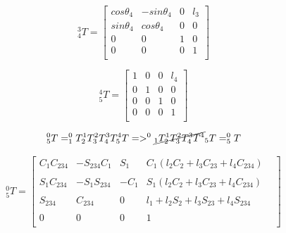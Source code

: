 \documentclass[transmag]{IEEEtran}
\begin{document}
\begin{eqfloat}
\begin{equation}
^3_4T =
\begin{bmatrix}
cos\theta_4 & -sin\theta_4 & 0      & l_3 \\
sin\theta_4 & cos\theta_4  & 0      & 0   \\
0           & 0            & 1      & 0   \\
0           & 0            & 0      & 1   \\
\end{bmatrix}
\end{equation}



\begin{equation}
^4_5T =
\begin{bmatrix}
1 & 0 & 0 & l_4  \\
0 & 1 & 0 & 0   \\
0 & 0 & 1 & 0   \\
0 & 0 & 0 & 1   \\
\end{bmatrix}
\end{equation}

\begin{equation}
^0_5T = ^0_1T  ^1_2T  ^2_3T  ^3_4T  ^4_5T => ^0 \cancel{_1T  ^1_2T  ^2_3T  ^3_4T  ^4} _5T = ^0_5T
\label{1-5}
\end{equation}




\begin{equation}
^0_5T =
\begin{bmatrix}
C_1C_{234}
& 
-S_{234}C_1
& 
S_1
& 
C_1(l_2 C_2 + l_3 C_{23} + l_4 C_{234}) \\
&&&&
\\
S_1 C_{234}     
& 
-S_1 S_{234} 
& 
-C_1
& 
 S_1 (l_2 C_2 + l_3 C_{23} + l_4 C_{234})
\\
&&&&
\\
S_{234}
&
C_{234}
&
0
&
l_1 + l_2 S_2 + l_3 S_{23} + l_4 S_{234} 
\\
&&&&
\\
0           & 0            & 0      & 1   \\
\end{bmatrix}
\label{Forward Kinematics}
\end{equation}

\end{eqfloat}
\end{document}
